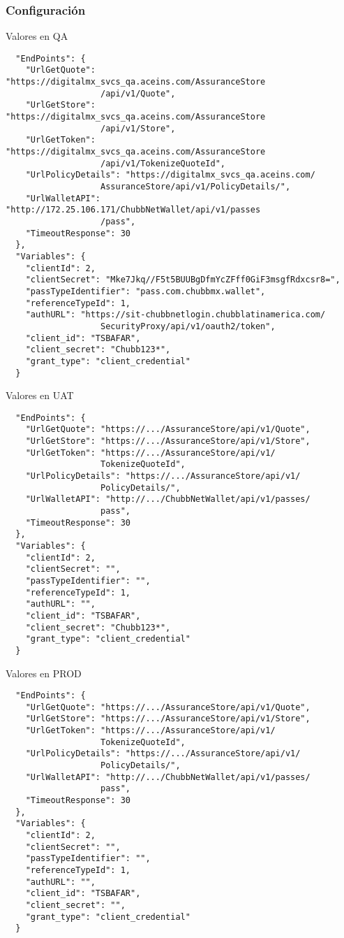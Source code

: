 \documentclass[12pt]{book} %
\begin{document}
\subsubsection{Configuración}
Valores en QA
\begin{verbatim}
  "EndPoints": {
    "UrlGetQuote": "https://digitalmx_svcs_qa.aceins.com/AssuranceStore
                   /api/v1/Quote",
    "UrlGetStore": "https://digitalmx_svcs_qa.aceins.com/AssuranceStore
                   /api/v1/Store",
    "UrlGetToken": "https://digitalmx_svcs_qa.aceins.com/AssuranceStore
                   /api/v1/TokenizeQuoteId",
    "UrlPolicyDetails": "https://digitalmx_svcs_qa.aceins.com/
                   AssuranceStore/api/v1/PolicyDetails/",
    "UrlWalletAPI": "http://172.25.106.171/ChubbNetWallet/api/v1/passes
                   /pass",
    "TimeoutResponse": 30
  },
  "Variables": {
    "clientId": 2,
    "clientSecret": "Mke7Jkq//F5t5BUUBgDfmYcZFff0GiF3msgfRdxcsr8=",
    "passTypeIdentifier": "pass.com.chubbmx.wallet",
    "referenceTypeId": 1,
    "authURL": "https://sit-chubbnetlogin.chubblatinamerica.com/
                   SecurityProxy/api/v1/oauth2/token",
    "client_id": "TSBAFAR",
    "client_secret": "Chubb123*",
    "grant_type": "client_credential"
  }

\end{verbatim}

Valores en UAT
\begin{verbatim}
  "EndPoints": {
    "UrlGetQuote": "https://.../AssuranceStore/api/v1/Quote",
    "UrlGetStore": "https://.../AssuranceStore/api/v1/Store",
    "UrlGetToken": "https://.../AssuranceStore/api/v1/
                   TokenizeQuoteId",
    "UrlPolicyDetails": "https://.../AssuranceStore/api/v1/
                   PolicyDetails/",
    "UrlWalletAPI": "http://.../ChubbNetWallet/api/v1/passes/
                   pass",
    "TimeoutResponse": 30
  },
  "Variables": {
    "clientId": 2,
    "clientSecret": "",
    "passTypeIdentifier": "",
    "referenceTypeId": 1,
    "authURL": "",
    "client_id": "TSBAFAR",
    "client_secret": "Chubb123*",
    "grant_type": "client_credential"
  }
\end{verbatim}

Valores en PROD
\begin{verbatim}
  "EndPoints": {
    "UrlGetQuote": "https://.../AssuranceStore/api/v1/Quote",
    "UrlGetStore": "https://.../AssuranceStore/api/v1/Store",
    "UrlGetToken": "https://.../AssuranceStore/api/v1/
                   TokenizeQuoteId",
    "UrlPolicyDetails": "https://.../AssuranceStore/api/v1/
                   PolicyDetails/",
    "UrlWalletAPI": "http://.../ChubbNetWallet/api/v1/passes/
                   pass",
    "TimeoutResponse": 30
  },
  "Variables": {
    "clientId": 2,
    "clientSecret": "",
    "passTypeIdentifier": "",
    "referenceTypeId": 1,
    "authURL": "",
    "client_id": "TSBAFAR",
    "client_secret": "",
    "grant_type": "client_credential"
  }
\end{verbatim}
\end{document}
